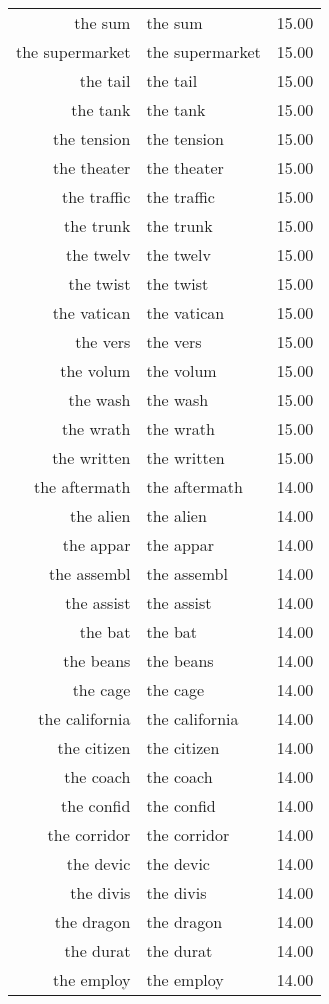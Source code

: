 \begin{table}[ht]
\begin{tabular}{rlr}
  the sum & the sum & 15.00 \\ 
  the supermarket & the supermarket & 15.00 \\ 
  the tail & the tail & 15.00 \\ 
  the tank & the tank & 15.00 \\ 
  the tension & the tension & 15.00 \\ 
  the theater & the theater & 15.00 \\ 
  the traffic & the traffic & 15.00 \\ 
  the trunk & the trunk & 15.00 \\ 
  the twelv & the twelv & 15.00 \\ 
  the twist & the twist & 15.00 \\ 
  the vatican & the vatican & 15.00 \\ 
  the vers & the vers & 15.00 \\ 
  the volum & the volum & 15.00 \\ 
  the wash & the wash & 15.00 \\ 
  the wrath & the wrath & 15.00 \\ 
  the written & the written & 15.00 \\ 
  the aftermath & the aftermath & 14.00 \\ 
  the alien & the alien & 14.00 \\ 
  the appar & the appar & 14.00 \\ 
  the assembl & the assembl & 14.00 \\ 
  the assist & the assist & 14.00 \\ 
  the bat & the bat & 14.00 \\ 
  the beans & the beans & 14.00 \\ 
  the cage & the cage & 14.00 \\ 
  the california & the california & 14.00 \\ 
  the citizen & the citizen & 14.00 \\ 
  the coach & the coach & 14.00 \\ 
  the confid & the confid & 14.00 \\ 
  the corridor & the corridor & 14.00 \\ 
  the devic & the devic & 14.00 \\ 
  the divis & the divis & 14.00 \\ 
  the dragon & the dragon & 14.00 \\ 
  the durat & the durat & 14.00 \\ 
  the employ & the employ & 14.00 \\ 

\end{tabular}
\end{table}
